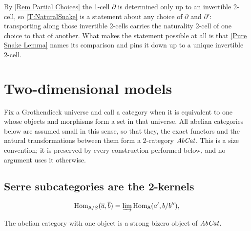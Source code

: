 \begin{remark}
  \label{Rem Naturality Choices}
  By \remx\ref{Rem Partial Choices} the 1-cell \(\partial\) is determined only up to an invertible 2-cell, so \thex\ref{T:NaturalSnake} is a statement about any choice of \(\partial\) and \(\partial'\): transporting along those invertible 2-cells carries the naturality 2-cell of one choice to that of another. What makes the statement possible at all is that \lemx\ref{Pure Snake Lemma} names its comparison and pins it down up to a unique invertible 2-cell.
\end{remark}

\section{Two-dimensional models}\label{S:Model}

\begin{convention}
  \label{Conv Size}
  Fix a Grothendieck universe and call a category  when it is equivalent to one whose objects and morphisms form a set in that universe. All abelian categories below are assumed small in this sense, so that they, the exact functors and the natural transformations between them form a 2-category \(\mathit{AbCat}\). This is a size convention; it is preserved by every construction performed below, and no argument uses it otherwise.
\end{convention}

\subsection{Serre subcategories are the 2-kernels}\label{SS:ModelAbCat}

\begin{equation}\label{SerreHom}
	\operatorname{Hom}_{\mathsf{A}/S}(\overline{a},\overline{b})=\varinjlim\operatorname{Hom}_{\mathsf{A}}(a',b/b'')\text{,}
\end{equation}

\begin{proposition}
  \label{P:AbCatBizero}   \leanok
  The abelian category with one object is a strong bizero object of \(\mathit{AbCat}\).
\end{proposition}

